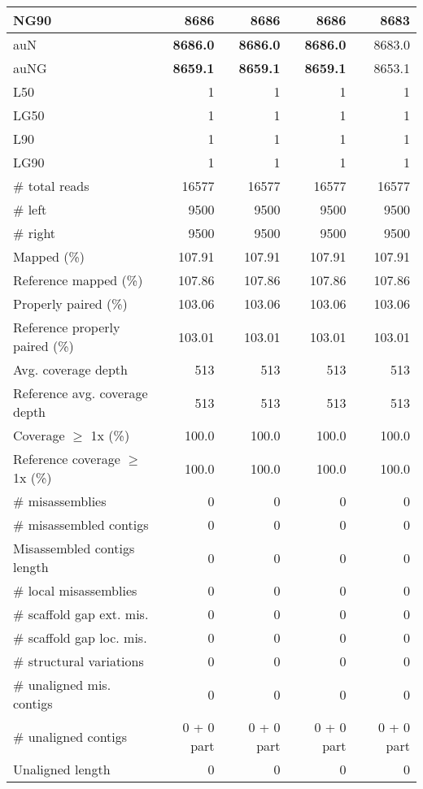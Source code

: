 \documentclass[12pt,a4paper]{article}
\begin{document}
\begin{table}[ht]
\begin{center}
\begin{tabular}{|l*{4}{|r}|}
NG90 & {\bf 8686} & {\bf 8686} & {\bf 8686} & 8683 \\ \hline
auN & {\bf 8686.0} & {\bf 8686.0} & {\bf 8686.0} & 8683.0 \\ \hline
auNG & {\bf 8659.1} & {\bf 8659.1} & {\bf 8659.1} & 8653.1 \\ \hline
L50 & 1 & 1 & 1 & 1 \\ \hline
LG50 & 1 & 1 & 1 & 1 \\ \hline
L90 & 1 & 1 & 1 & 1 \\ \hline
LG90 & 1 & 1 & 1 & 1 \\ \hline
\# total reads & 16577 & 16577 & 16577 & 16577 \\ \hline
\# left & 9500 & 9500 & 9500 & 9500 \\ \hline
\# right & 9500 & 9500 & 9500 & 9500 \\ \hline
Mapped (\%) & 107.91 & 107.91 & 107.91 & 107.91 \\ \hline
Reference mapped (\%) & 107.86 & 107.86 & 107.86 & 107.86 \\ \hline
Properly paired (\%) & 103.06 & 103.06 & 103.06 & 103.06 \\ \hline
Reference properly paired (\%) & 103.01 & 103.01 & 103.01 & 103.01 \\ \hline
Avg. coverage depth & 513 & 513 & 513 & 513 \\ \hline
Reference avg. coverage depth & 513 & 513 & 513 & 513 \\ \hline
Coverage $\geq$ 1x (\%) & 100.0 & 100.0 & 100.0 & 100.0 \\ \hline
Reference coverage $\geq$ 1x (\%) & 100.0 & 100.0 & 100.0 & 100.0 \\ \hline
\# misassemblies & 0 & 0 & 0 & 0 \\ \hline
\# misassembled contigs & 0 & 0 & 0 & 0 \\ \hline
Misassembled contigs length & 0 & 0 & 0 & 0 \\ \hline
\# local misassemblies & 0 & 0 & 0 & 0 \\ \hline
\# scaffold gap ext. mis. & 0 & 0 & 0 & 0 \\ \hline
\# scaffold gap loc. mis. & 0 & 0 & 0 & 0 \\ \hline
\# structural variations & 0 & 0 & 0 & 0 \\ \hline
\# unaligned mis. contigs & 0 & 0 & 0 & 0 \\ \hline
\# unaligned contigs & 0 + 0 part & 0 + 0 part & 0 + 0 part & 0 + 0 part \\ \hline
Unaligned length & 0 & 0 & 0 & 0 \\ \hline

\end{tabular}
\end{center}
\end{table}
\end{document}
